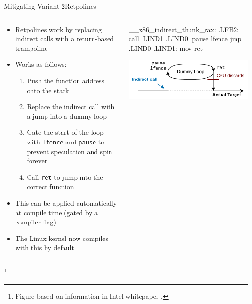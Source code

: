 \documentclass[10pt, dvipsnames, aspectratio=169]{beamer}
\newcommand\ufootnote[1]{%
    \begingroup
        \renewcommand\thefootnote{}\footnote{\hspace{-1.8em}#1}%
        \addtocounter{footnote}{-1}%
    \endgroup
}
\begin{document}
\begingroup
\setwatermark{}
\begin{frame}[c,fragile]{Mitigating Variant 2}{Retpolines}
  \begin{columns}
    \begin{column}[t]{0.5\textwidth}
      \begin{itemize}
        \item Retpolines work by replacing indirect calls with a return-based trampoline
        \item Works as follows:
        \begin{enumerate}
          \item Push the function address onto the stack
          \item Replace the indirect call with a jump into a dummy loop
          \item Gate the start of the loop with {\tt lfence} and {\tt pause} to prevent speculation and spin forever
          \item Call {\tt ret} to jump into the correct function
        \end{enumerate}
        \item This can be applied automatically at compile time (gated by a compiler flag)
        \item The Linux kernel now compiles with this by default
      \end{itemize}
    \end{column}

    \begin{column}[t]{0.5\textwidth}
      \begin{listing}[language=x64,gobble=8,xleftmargin=6em]
        __x86_indirect_thunk_rax:
        .LFB2:
          call	.LIND1
        .LIND0:
          pause
          lfence
          jmp	.LIND0
        .LIND1:
          mov	%
          ret
      \end{listing}
      \vspace{1em}
      \color{black}%
      \includegraphics[width=0.9\columnwidth]{figs/retpoline.pdf}%
    \end{column}
  \end{columns}

  \ufootnote{Figure based on information in Intel whitepaper \cite{intel_retpoline}.}
\end{frame}
\endgroup
\end{document}
